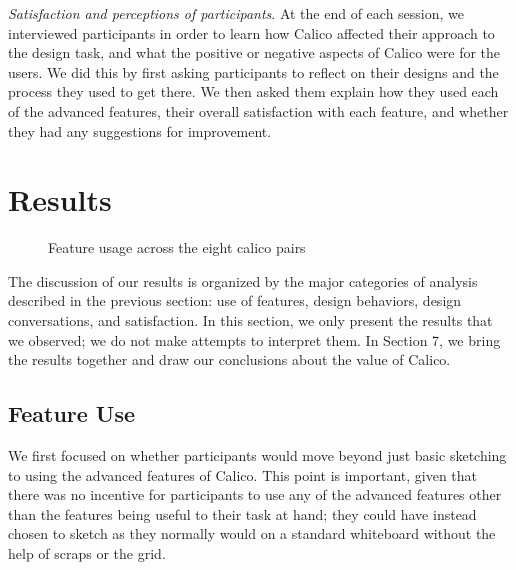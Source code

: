    \emph{Satisfaction and perceptions of participants}. At the end of each session, we interviewed participants in order to learn how Calico affected their approach to the design task, and what the positive or negative aspects of Calico were for the users. We did this by first asking participants to reflect on their designs and the process they used to get there. We then asked them explain how they used each of the advanced features, their overall satisfaction with each feature, and whether they had any suggestions for improvement. 

\section{Results}
\label{results}



\begin{figure}
  \centering


 
\caption{Feature usage across the eight calico pairs}
\label{fig:6}       %
\end{figure}
%


The discussion of our results is organized by the major categories of analysis described in the previous section: use of features, design behaviors, design conversations, and satisfaction. In this section, we only present the results that we observed; we do not make attempts to interpret them. In Section 7, we bring the results together and draw our conclusions about the value of Calico.

\subsection {Feature Use}
\label{results:1}

We first focused on whether participants would move beyond just basic sketching to using the advanced features of Calico. This point is important, given that there was no incentive for participants to use any of the advanced features other than the features being useful to their task at hand; they could have instead chosen to sketch as they normally would on a standard whiteboard without the help of scraps or the grid. 

